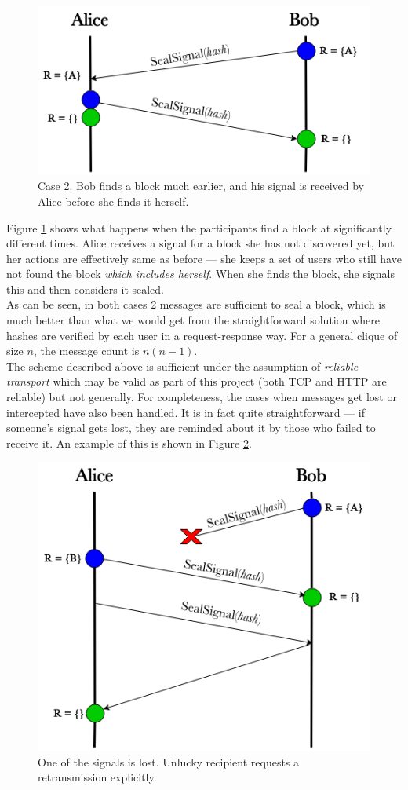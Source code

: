 \documentclass[a4paper, twoside, 12pt]{report}
\begin{document}
\begin{figure}[H]
    \captionsetup{width=0.76\textwidth}
    \centering
    \includegraphics[width=0.6\linewidth]{pics/sealing_lag.png}
    \caption{\label{fig:sealing_lag} Case 2. Bob finds a block much earlier, and his signal is received by Alice before she finds it herself.}
\end{figure}

Figure \ref{fig:sealing_lag} shows what happens when the participants find a block at significantly different times. Alice receives a signal for a block she has not discovered yet, but her actions are effectively same as before --- she keeps a set of users who still have not found the block \emph{which includes herself}. When she finds the block, she signals this and then considers it sealed. \\


As can be seen, in both cases 2 messages are sufficient to seal a block, which is much better than what we would get from the straightforward solution where hashes are verified by each user in a request-response way. For a general clique of size $n$, the message count is $n (n-1)$. \\

The scheme described above is sufficient under the assumption of \emph{reliable transport} which may be valid as part of this project (both TCP and HTTP are reliable) but not generally. For completeness, the cases when messages get lost or intercepted have also been handled. It is in fact quite straightforward --- if someone's signal gets lost, they are reminded about it by those who failed to receive it. An example of this is shown in Figure \ref{fig:sealing_lost}.

\begin{figure}[H]
    \captionsetup{width=0.76\textwidth}
    \centering
    \includegraphics[width=0.6\linewidth]{pics/sealing_lost.png}
    \caption{\label{fig:sealing_lost} One of the signals is lost. Unlucky recipient requests a retransmission explicitly.}
\end{figure}
\end{document}

